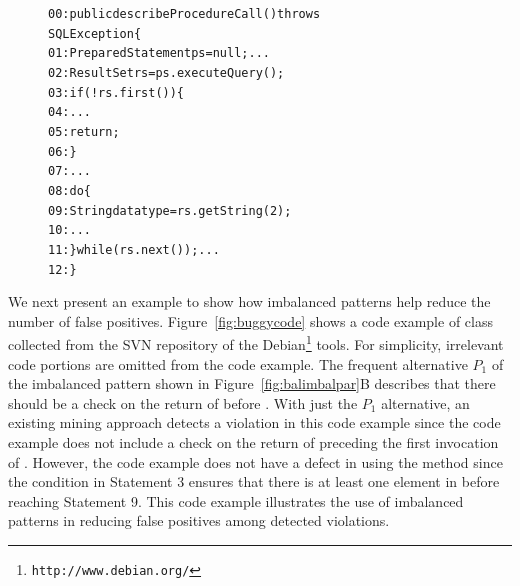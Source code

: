 \begin{figure}[t]
\begin{CodeOut}
\begin{alltt}
00:public describeProcedureCall() throws 
\hspace*{1.5in}SQLException \{
01:\hspace*{0.2in}PreparedStatement ps = null; ...
02:\hspace*{0.2in}ResultSet rs = ps.executeQuery();
03:\hspace*{0.2in}if(!rs.first())  \{
04:\hspace*{0.4in}...
05:\hspace*{0.4in}return;
06:\hspace*{0.2in}\}
07:\hspace*{0.2in}...
08:\hspace*{0.2in}do \{
09:\hspace*{0.4in}String datatype = rs.getString(2);
10:\hspace*{0.4in}...
11:\hspace*{0.2in}\} while(rs.next()); ...
12:\}
\end{alltt}
\end{CodeOut}\vspace*{-1ex}
\vspace*{-3ex}
\end{figure}

We next present an example to show how imbalanced patterns help reduce the number of false positives. Figure~\ref{fig:buggycode} shows a code example of class  collected from the SVN repository of the Debian\footnote{\texttt{http://www.debian.org/}} tools. For simplicity, irrelevant code portions are omitted from the code example. The frequent alternative $P_1$ of the imbalanced pattern shown in Figure~\ref{fig:balimbalpar}B describes that there should be a  check on the return of  before . With just the $P_1$ alternative, an existing mining approach detects a violation in this code example since the code example does not include a  check on the return of  preceding the first invocation of . However, the code example does not have a defect in using the  method since the  condition in Statement 3 ensures that there is at least one element in  before reaching  Statement 9. This code example illustrates the use of imbalanced patterns in reducing false positives among detected violations.

